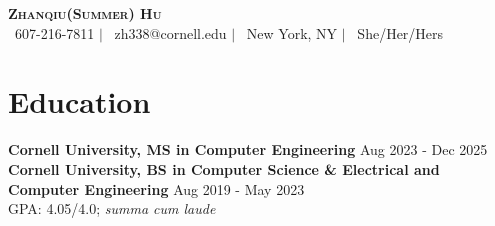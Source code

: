 \documentclass[letterpaper,10pt]{article}
\newcommand{\educationEntry}[4]{
    \textbf{#1} \hfill #2 \\
    #3 \hfill #4
    \vspace{2pt}
}
\begin{document}
\begin{center}
    \textbf{\LARGE \scshape Zhanqiu(Summer) Hu} \\
    \faPhone \, 607-216-7811 $|$ \faEnvelope \, {zh338@cornell.edu} $|$ \faMapMarker \, New York, NY $|$ \faUser \, She/Her/Hers
\end{center}





\section{Education}
\vspace{2pt}

\textbf{Cornell University, MS in Computer Engineering} \hfill Aug 2023 - Dec 2025 \\

\textbf{Cornell University, BS in Computer Science \& Electrical and Computer Engineering} \hfill Aug 2019 - May 2023 \\
GPA: 4.05/4.0; \textit{summa cum laude} \\
\vspace{6pt}
\end{document}
